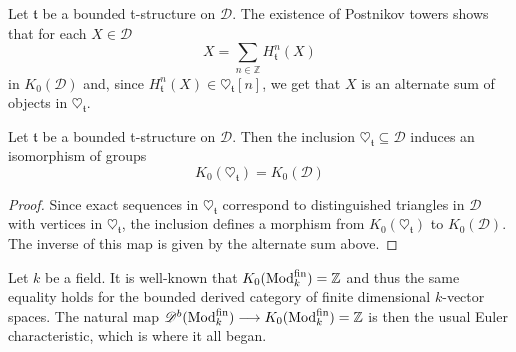 Let $\mathfrak{t}$ be a bounded t-structure on $\mathscr{D}$. The existence of Postnikov towers shows that for each $X \in \mathscr{D}$ $$X= \sum_{n \in \mathbb{Z}} H^n_{\mathfrak{t}}(X)$$ in $K_0(\mathscr{D})$ and, since $H^n_{\mathfrak{t}}(X) \in \heartsuit_{\mathfrak{t}}[n]$, we get that $X$ is an alternate sum of objects in $\heartsuit_{\mathfrak{t}}$. \\

\begin{prop} 
Let $\mathfrak{t}$ be a bounded t-structure on $\mathscr{D}$. Then the inclusion $\heartsuit_{\mathfrak{t}} \subseteq \mathscr{D}$ induces an isomorphism of groups $$K_0(\heartsuit_{\mathfrak{t}})=K_0(\mathscr{D})$$
\end{prop}

\begin{proof} 
Since exact sequences in $\heartsuit_{\mathfrak{t}}$ correspond to distinguished triangles in $\mathscr{D}$ with vertices in $\heartsuit_{\mathfrak{t}}$, the inclusion defines a morphism from $K_0(\heartsuit_{\mathfrak{t}})$ to $K_0(\mathscr{D})$. The inverse of this map is given by the alternate sum above. 
\end{proof}

\begin{exmp}\label{fit}
Let $k$ be a field. It is well-known that $K_0(\textnormal{Mod}_k^{\textnormal{fin}})=\mathbb{Z}$ and thus the same equality holds for the bounded derived category of finite dimensional $k$-vector spaces. The natural map $\mathscr{D}^b(\textnormal{Mod}_k^{\textnormal{fin}}) \longrightarrow K_0(\textnormal{Mod}_k^{\textnormal{fin}})=\mathbb{Z}$ is then the usual Euler characteristic, which is where it all began. 
\end{exmp}
